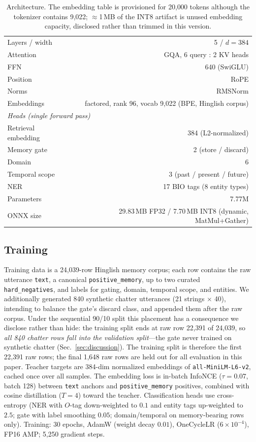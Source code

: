 \documentclass[11pt]{article}
\begin{document}
\begin{table}[t]
\centering\small
\caption{Architecture. The embedding table is provisioned for 20{,}000 tokens although the tokenizer contains 9{,}022; $\approx$1\,MB of the INT8 artifact is unused embedding capacity, disclosed rather than trimmed in this version.}
\begin{tabular}{lr}
\toprule
Layers / width & 5 / $d{=}384$ \\
Attention & GQA, 6 query : 2 KV heads \\
FFN & 640 (SwiGLU) \\
Position & RoPE \\
Norms & RMSNorm \\
Embeddings & factored, rank 96, vocab 9{,}022 (BPE, Hinglish corpus) \\
\midrule
\multicolumn{2}{l}{\emph{Heads (single forward pass)}} \\
Retrieval embedding & 384 (L2-normalized) \\
Memory gate & 2 (store / discard) \\
Domain & 6 \\
Temporal scope & 3 (past / present / future) \\
NER & 17 BIO tags (8 entity types) \\
\midrule
Parameters & 7.77M \\
ONNX size & 29.83\,MB FP32 / 7.70\,MB INT8 (dynamic, MatMul+Gather) \\
\bottomrule
\end{tabular}
\end{table}

\subsection{Training}
Training data is a 24{,}039-row Hinglish memory corpus; each row contains the raw utterance \texttt{text}, a canonical \texttt{positive\_memory}, up to two curated \texttt{hard\_negatives}, and labels for gating, domain, temporal scope, and entities. We additionally generated 840 synthetic chatter utterances (21 strings $\times$ 40), intending to balance the gate's discard class, and appended them after the raw corpus. %
Under the sequential 90/10 split this placement has a consequence we disclose rather than hide: the training split ends at raw row 22{,}391 of 24{,}039, so \emph{all 840 chatter rows fall into the validation split}---the gate never trained on synthetic chatter (Sec.~\ref{sec:discussion}). The training split is therefore the first 22{,}391 raw rows; the final 1{,}648 raw rows are held out for all evaluation in this paper. Teacher targets are 384-dim normalized embeddings of \texttt{all-MiniLM-L6-v2}, cached once over all samples. The embedding loss is in-batch InfoNCE ($\tau{=}0.07$, batch 128) between \texttt{text} anchors and \texttt{positive\_memory} positives, combined with cosine distillation ($T{=}4$) toward the teacher. Classification heads use cross-entropy (NER with $O$-tag down-weighted to $0.1$ and entity tags up-weighted to $2.5$; gate with label smoothing $0.05$; domain/temporal on memory-bearing rows only). Training: 30 epochs, AdamW (weight decay $0.01$), OneCycleLR ($6\times10^{-4}$), FP16 AMP; 5{,}250 gradient steps.
\end{document}
